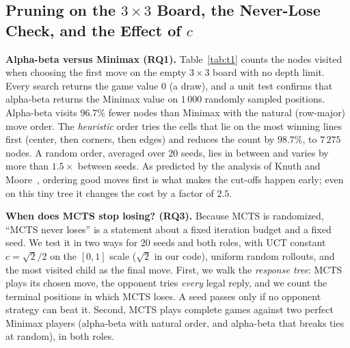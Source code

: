 \subsection{Pruning on the $3\times 3$ Board, the Never-Lose Check, and the Effect of $c$}
\label{subsec:results_tv1}

\textbf{Alpha-beta versus Minimax (RQ1).} Table~\ref{tab:t1} counts the nodes visited when choosing the first move on the empty $3\times 3$ board with no depth limit. Every search returns the game value $0$ (a draw), and a unit test confirms that alpha-beta returns the Minimax value on $1\,000$ randomly sampled positions. Alpha-beta visits $96.7\%$ fewer nodes than Minimax with the natural (row-major) move order. The \emph{heuristic} order tries the cells that lie on the most winning lines first (center, then corners, then edges) and reduces the count by $98.7\%$, to $7\,275$ nodes. A random order, averaged over $20$ seeds, lies in between and varies by more than $1.5\times$ between seeds. As predicted by the analysis of Knuth and Moore~\cite{knuth1975analysis}, ordering good moves first is what makes the cut-offs happen early; even on this tiny tree it changes the cost by a factor of $2.5$.

\begin{table}[t]
\centering
\caption{T1: Nodes visited from the empty $3\times 3$ board (no depth limit)}
\label{tab:t1}

\end{table}

\textbf{When does MCTS stop losing? (RQ3).} Because MCTS is randomized, ``MCTS never loses'' is a statement about a fixed iteration budget and a fixed seed. We test it in two ways for $20$ seeds and both roles, with UCT constant $c = \sqrt{2}/2$ on the $[0,1]$ scale ($\sqrt{2}$ in our code), uniform random rollouts, and the most visited child as the final move. First, we walk the \emph{response tree}: MCTS plays its chosen move, the opponent tries \emph{every} legal reply, and we count the terminal positions in which MCTS loses. A seed passes only if no opponent strategy can beat it. Second, MCTS plays complete games against two perfect Minimax players (alpha-beta with natural order, and alpha-beta that breaks ties at random), in both roles.

\begin{table}[t]
\centering
\caption{T3: Never-lose check of MCTS on $3\times 3$ Tic-Tac-Toe ($20$ seeds, both roles; draws are out of $80$ games against perfect Minimax)}
\label{tab:t3}

\end{table}

